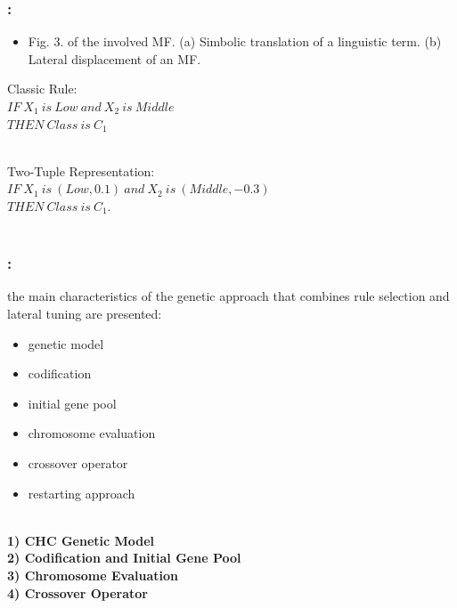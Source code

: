 \documentclass{beamer}
\begin{document}
\begin{CJK*}{UTF8}{bsmi}

\begin{frame}
	\frametitle{\insertsection : \insertsubsection}
	
		\begin{itemize}
			\item Fig. 3.
			of the involved MF. (a) Simbolic translation of a linguistic term. (b) Lateral displacement of an MF.
		\end{itemize}
	\begin{block}{Classic Rule: }
		~\\
		\centering\textbf{$IF ~X_{1}~ is ~Low ~and~ X_{2}~ is~ Middle $}\\
			\centering\textbf{$THEN~ Class~ is~ C_{1}$}\\
		~\\

	\end{block}
		\begin{block}{Two-Tuple Representation:}
			~\\
			\centering\textbf{$IF ~X_{1}~ is~ (Low, 0.1)~ and ~X_{2}~ is~ (Middle, -0.3)$}\\
			\centering\textbf{$THEN ~Class~ is~C_{1} .$}\\
			~\\

		\end{block}

	
\end{frame}



\begin{frame}
	\frametitle{\insertsection : \insertsubsection}
	the main characteristics of the genetic approach that combines rule selection and lateral tuning are presented:
	\begin{itemize}
		\item  genetic model
		\item codification
		\item initial gene pool
		\item chromosome evaluation
		\item crossover operator
		\item restarting approach
	\end{itemize}
	\begin{block}{ }
		~\\
		\textbf{1) CHC Genetic Model}\\
		\textbf{2) Codification and Initial Gene Pool}\\
		\textbf{3) Chromosome Evaluation}\\
		\textbf{4) Crossover Operator}\\
		~\\
	\end{block}


\end{frame}
\end{CJK*}
\end{document}
